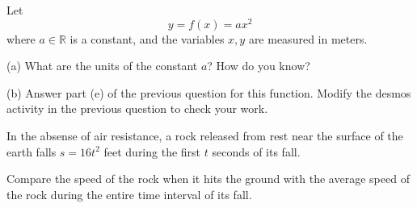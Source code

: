 \documentclass{ximera}
\begin{document}
\begin{question}  \label{Qerdfggg}
Let
\[
     y = f(x) = a x^2
\]
where $a\in \mathbb{R}$ is a constant, and the variables $x, y$ are measured in meters.

(a) What are the units of the constant $a$? How do you know?

(b) Answer part (e) of the previous question for this function. Modify the desmos activity in the previous question to check your work.
\end{question}


\begin{question}  \label{Qdfgbbvvd}
In the absense of air resistance, a rock released from rest near the surface of the earth falls $s=16t^2$ feet during the first $t$ seconds of its fall.

Compare the speed of the rock when it hits the ground with the average speed of the rock during the entire time interval of its fall.
\end{question}
\end{document}

